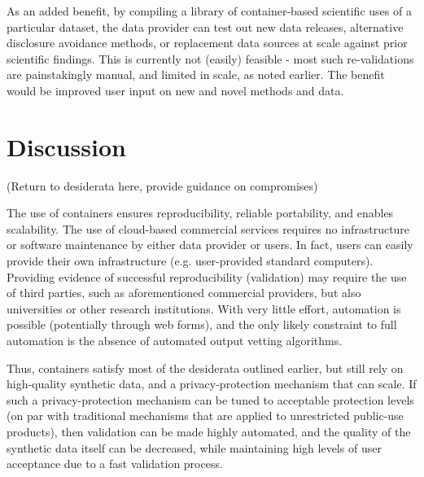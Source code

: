 \documentclass[]{hdsr}
\begin{document}
As an added benefit, by compiling a library of container-based scientific uses of a particular dataset, the data provider can test out new data releases, alternative disclosure avoidance methods, or replacement data sources  at scale against prior scientific findings. This is currently not (easily) feasible - most such re-validations are painstakingly manual, and limited in scale, as noted earlier. The benefit would be improved user input on new and novel methods and data.


\section{Discussion}

(Return to desiderata here, provide guidance on compromises)

The use of containers ensures reproducibility, reliable portability, and enables scalability. The use of cloud-based commercial services requires no infrastructure or software maintenance by either data provider or users. In fact,  users  can easily provide their own infrastructure (e.g. user-provided standard computers). Providing evidence of successful reproducibility (validation) may require the use of third parties, such as aforementioned commercial providers, but also universities or other research institutions. With very little effort, automation is possible (potentially through web forms), and the only likely constraint to full automation is the absence of automated output vetting algorithms. 

Thus, containers satisfy most of the desiderata outlined earlier, but still rely on high-quality synthetic data, and a privacy-protection mechanism that can scale. If such a privacy-protection mechanism can be tuned to acceptable protection levels (on par with traditional mechanisms that are applied to unrestricted public-use products), then validation can be made highly automated, and the quality of the synthetic data itself can be decreased, while maintaining high levels of user acceptance due to a fast validation process.
\end{document}
